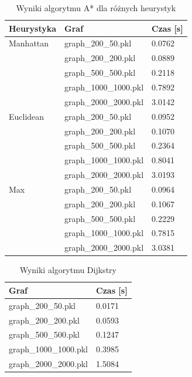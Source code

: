 \documentclass[12pt,twoside]{article}
\begin{document}
\clearpage

\begin{table}[ht]
\caption{Wyniki algorytmu A* dla różnych heurystyk}
\centering		
\begin{tabular}{|p{}|p{}|p{}|}	
\hline
Heurystyka & Graf & Czas [s] \\
\hline
Manhattan & 
graph\_200\_50.pkl & 
0.0762 \\
 & 
graph\_200\_200.pkl & 
0.0889 \\
 & 
graph\_500\_500.pkl & 
0.2118 \\
 & 
graph\_1000\_1000.pkl & 
0.7892 \\
 & 
graph\_2000\_2000.pkl & 
3.0142 \\
\hline
Euclidean & 
graph\_200\_50.pkl & 
0.0952 \\
 & 
graph\_200\_200.pkl & 
0.1070 \\
 & 
graph\_500\_500.pkl & 
0.2364 \\
 & 
graph\_1000\_1000.pkl & 
0.8041 \\
 & 
graph\_2000\_2000.pkl & 
3.0193 \\
\hline
Max & 
graph\_200\_50.pkl & 
0.0964 \\
 & 
graph\_200\_200.pkl & 
0.1067 \\
 & 
graph\_500\_500.pkl & 
0.2229 \\
 & 
graph\_1000\_1000.pkl & 
0.7815 \\
 & 
graph\_2000\_2000.pkl & 
3.0381 \\
\hline
\end{tabular}	

\label{Tab:Astar_results}
\end{table}


\begin{table}[ht]
\caption{Wyniki algorytmu Dijkstry}
\centering		
\begin{tabular}{|p{}|p{}|}	
\hline
Graf & Czas [s] \\
\hline
graph\_200\_50.pkl & 
0.0171 \\
graph\_200\_200.pkl & 
0.0593 \\
graph\_500\_500.pkl & 
0.1247 \\
graph\_1000\_1000.pkl & 
0.3985 \\
graph\_2000\_2000.pkl & 
1.5084 \\
\hline
\end{tabular}	

\label{Tab:Dijkstra_results}
\end{table}
\end{document}
